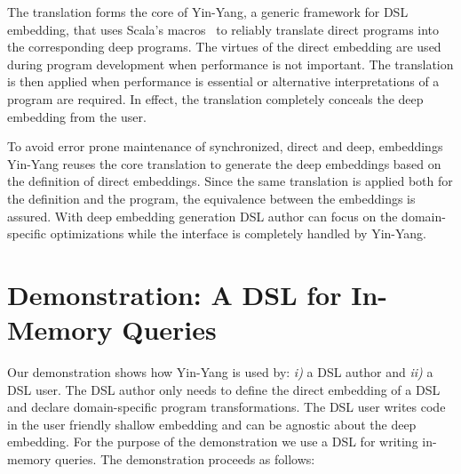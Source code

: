 \documentclass{llncs}
\newcommand{\tool}{Yin-Yang\xspace}
\begin{document}
The translation forms the core of \tool, a generic framework for DSL
embedding, that uses Scala's macros~\cite{burmako_scala_2013} to reliably
translate direct \edsl{} programs into the corresponding deep \edsl programs.
The virtues of the direct embedding are used during program development when
performance is not important. The translation is then applied when performance
is essential or alternative interpretations of a program are required. In
effect, the translation completely conceals the deep embedding from the user.

To avoid error prone maintenance of synchronized, direct and deep, embeddings
\tool reuses the core translation to generate the deep embeddings based on the
definition of direct embeddings. Since the same translation is applied both
for the \edsl definition and the \edsl program, the equivalence between the
embeddings is assured. With deep embedding generation DSL author can focus on
the domain-specific optimizations while the interface is completely handled by
\tool.


\section{Demonstration: A DSL for In-Memory Queries}


  Our demonstration shows how \tool is used by: \emph{i)} a DSL author and \emph{ii)} a DSL user. The DSL author only needs to define the direct embedding of a DSL and declare domain-specific program transformations. The DSL user writes code in the user friendly shallow embedding and can be agnostic about the deep embedding. For the purpose of the demonstration we use a DSL for writing in-memory queries. The demonstration proceeds as follows:
\end{document}
